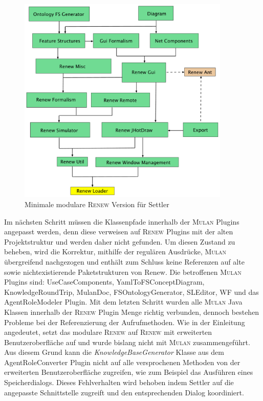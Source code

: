 	\begin{figure}[h!]
	  \centering
	  \includegraphics[width=0.9\textwidth]{material/images/settler-renew-tree-extend.pdf}
	  \caption{Minimale modulare \textsc{Renew} Version für Settler}
	  \label{fig:renew_mulan_plugins}
	\end{figure}	

	Im nächsten Schritt müssen die Klassenpfade innerhalb der \textsc{Mulan} Plugins angepasst werden, denn diese verweisen auf \textsc{Renew} Plugins mit der alten Projektstruktur und werden daher nicht gefunden. Um diesen Zustand zu beheben, wird die Korrektur, mithilfe der regulären Ausdrücke, \textsc{Mulan} übergreifend nachgezogen und enthält zum Schluss keine Referenzen auf alte sowie nichtexistierende Paketstrukturen von Renew. Die betroffenen \textsc{Mulan} Plugins sind: UseCaseComponents, YamlToFSConceptDiagram, KnowledgeRoundTrip, MulanDoc, FSOntologyGenerator, SLEditor, WF und das AgentRoleModeler Plugin. \newline
	Mit dem letzten Schritt wurden alle \textsc{Mulan} Java Klassen innerhalb der \textsc{Renew} Plugin Menge richtig verbunden, dennoch bestehen Probleme bei der Referenzierung der Aufrufmethoden. Wie in der Einleitung angedeutet, setzt das modulare \textsc{Renew} auf \textsc{Renew} mit erweiterten Benutzeroberfläche auf und wurde bislang nicht mit \textsc{Mulan} zusammengeführt. Aus diesem Grund kann die \textit{KnowledgeBaseGenerator} Klasse aus dem AgentRoleConverter Plugin nicht auf alle versprochenen Methoden von der erweiterten Benutzeroberfläche zugreifen, wie zum Beispiel das Ausführen eines Speicherdialogs. Dieses Fehlverhalten wird behoben indem Settler auf die angepasste Schnittstelle zugreift und den entsprechenden Dialog koordiniert. \bigbreak

